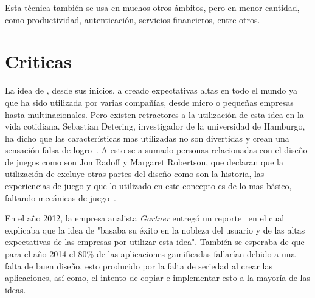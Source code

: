Esta técnica también se usa en muchos otros ámbitos, pero en menor cantidad,
como productividad, autenticación, servicios financieros, entre otros.

\section{Criticas}

La idea de {\GAM}, desde sus inicios, a creado expectativas altas en todo el mundo
ya que ha sido utilizada por varias compañías, desde micro o pequeñas empresas
hasta multinacionales.
Pero existen retractores a la utilización de esta idea en la vida cotidiana.
Sebastian Detering, investigador de la universidad de Hamburgo, ha dicho que las
características mas utilizadas no son divertidas y crean una sensación falsa de
logro~\cite{Gam:Crit:1}.
A esto se a sumado personas relacionadas con el diseño de juegos como son
Jon Radoff y Margaret Robertson,  que declaran que la utilización de {\GAM}
excluye otras partes del diseño como son la historia, las experiencias de juego
y que lo utilizado en este concepto es de lo mas básico, faltando mecánicas de
juego~\cite{Gam:Crit:2}.

En el año 2012, la empresa analista \emph{Gartner} entregó un
reporte~\cite{Gam:Crit:3} en el cual explicaba que la idea de {\GAM}
"basaba su éxito en la nobleza del usuario y de las altas expectativas
de las empresas por utilizar esta idea".
También se esperaba de que para el año 2014 el 80\% de las aplicaciones
gamificadas fallarían debido a una falta de buen diseño,
esto producido por la falta de seriedad al crear las aplicaciones,
así como, el intento de copiar e implementar esto a la mayoría de las ideas.
